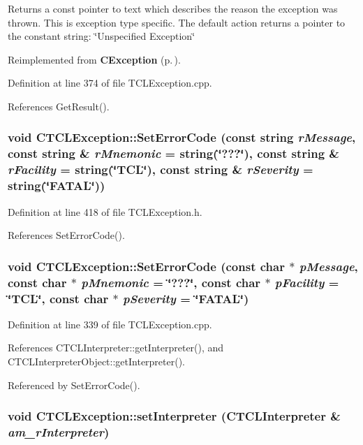 Returns a const pointer to text which describes the reason the exception was thrown. This is exception type specific. The default action returns a pointer to the constant string: \char`\"{}Unspecified Exception\char`\"{} 

Reimplemented from {\bf CException} {\rm (p.\,\pageref{classCException_a8})}.

Definition at line 374 of file TCLException.cpp.

References Get\-Result().
\subsubsection{\setlength{\rightskip}{0pt plus 5cm}void CTCLException::Set\-Error\-Code (const string {\em r\-Message}, const string \& {\em r\-Mnemonic} = string(\char`\"{}???\char`\"{}), const string \& {\em r\-Facility} = string(\char`\"{}TCL\char`\"{}), const string \& {\em r\-Severity} = string(\char`\"{}FATAL\char`\"{}))\hspace{0.3cm}{\tt  [inline]}}\label{classCTCLException_a11}




Definition at line 418 of file TCLException.h.

References Set\-Error\-Code().
\subsubsection{\setlength{\rightskip}{0pt plus 5cm}void CTCLException::Set\-Error\-Code (const char $\ast$ {\em p\-Message}, const char $\ast$ {\em p\-Mnemonic} = \char`\"{}???\char`\"{}, const char $\ast$ {\em p\-Facility} = \char`\"{}TCL\char`\"{}, const char $\ast$ {\em p\-Severity} = \char`\"{}FATAL\char`\"{})}\label{classCTCLException_a10}




Definition at line 339 of file TCLException.cpp.

References CTCLInterpreter::get\-Interpreter(), and CTCLInterpreter\-Object::get\-Interpreter().

Referenced by Set\-Error\-Code().
\subsubsection{\setlength{\rightskip}{0pt plus 5cm}void CTCLException::set\-Interpreter ({\bf CTCLInterpreter} \& {\em am\_\-r\-Interpreter})\hspace{0.3cm}{\tt  [inline, protected]}}\label{classCTCLException_b0}




